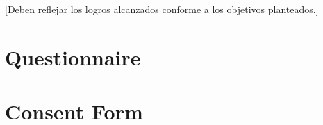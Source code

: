 \documentclass[12pt]{caltech_thesis}
\begin{document}
[Deben reflejar los logros alcanzados conforme a los objetivos planteados.]


\printbibliography[heading=bibintoc]


\appendix


\chapter{Questionnaire}


\chapter{Consent Form}


\printindex


\theendnotes


\pocketmaterial
{} 
\end{document}
